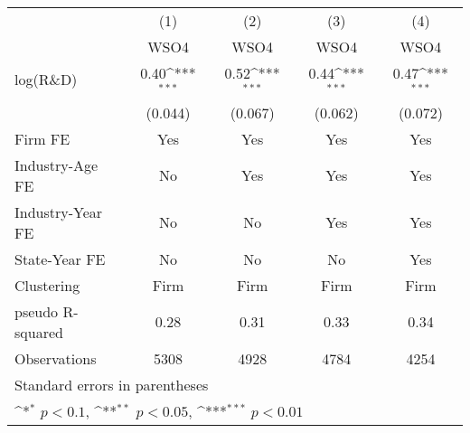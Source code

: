 {
\def\sym#1{\ifmmode^{#1}\else\(^{#1}\)\fi}
\begin{tabular}{l*{4}{c}}
\toprule
                    &\multicolumn{1}{c}{(1)}&\multicolumn{1}{c}{(2)}&\multicolumn{1}{c}{(3)}&\multicolumn{1}{c}{(4)}\\
                    &\multicolumn{1}{c}{WSO4}&\multicolumn{1}{c}{WSO4}&\multicolumn{1}{c}{WSO4}&\multicolumn{1}{c}{WSO4}\\
\midrule
log(R\&D)           &        0.40\sym{***}&        0.52\sym{***}&        0.44\sym{***}&        0.47\sym{***}\\
                    &     (0.044)         &     (0.067)         &     (0.062)         &     (0.072)         \\
\addlinespace
Firm FE             &         Yes         &         Yes         &         Yes         &         Yes         \\
\addlinespace
Industry-Age FE     &          No         &         Yes         &         Yes         &         Yes         \\
\addlinespace
Industry-Year FE    &          No         &          No         &         Yes         &         Yes         \\
\addlinespace
State-Year FE       &          No         &          No         &          No         &         Yes         \\
\midrule
Clustering          &       Firm         &       Firm         &       Firm         &       Firm         \\
pseudo R-squared    &        0.28         &        0.31         &        0.33         &        0.34         \\
Observations        &        5308         &        4928         &        4784         &        4254         \\
\bottomrule
\multicolumn{5}{l}{\tiny Standard errors in parentheses}\\
\multicolumn{5}{l}{\tiny \sym{*} \(p<0.1\), \sym{**} \(p<0.05\), \sym{***} \(p<0.01\)}\\
\end{tabular}
}
